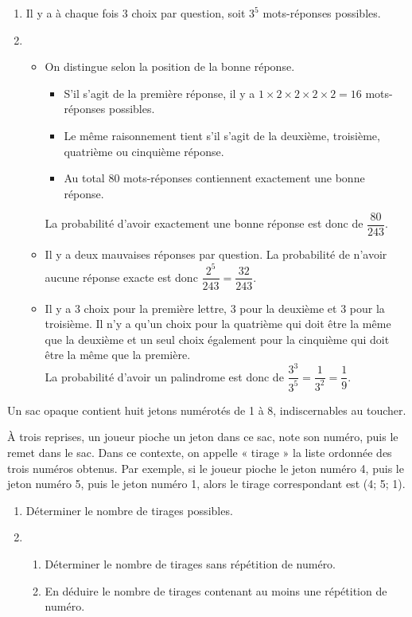 \documentclass[11pt,fleqn, openany]{book} %
\begin{document}
\begin{solution}\hspace{0pt}
\vspace{-0.5cm}
\begin{enumerate}
\item Il y a à chaque fois 3 choix par question, soit $3^5$ mots-réponses possibles.
\item 
\begin{itemize}
\item  On distingue selon la position de la bonne réponse.
\begin{itemize}
\item S'il s'agit de la première réponse, il y a $1 \times 2 \times 2 \times 2 \times 2 = 16$ mots-réponses possibles.
\item Le même raisonnement tient s'il s'agit de la deuxième, troisième, quatrième ou cinquième réponse.
\item Au total 80 mots-réponses contiennent exactement une bonne réponse.
\end{itemize}
La probabilité d'avoir exactement une bonne réponse est donc de $\dfrac{80}{243}$.
\item Il y a deux mauvaises réponses par question. La probabilité de n'avoir aucune réponse exacte est donc $\dfrac{2^5}{243}=\dfrac{32}{243}$.
\item Il y a 3 choix pour la première lettre, 3 pour la deuxième et 3 pour la troisième. Il n'y a qu'un choix pour la quatrième qui doit être la même que la deuxième et un seul choix également pour la cinquième qui doit être la même que la première. \\La probabilité d'avoir un palindrome est donc de $\dfrac{3^3}{3^5}=\dfrac{1}{3^2}=\dfrac{1}{9}$.\end{itemize}
\end{enumerate}\end{solution}

\begin{exercise}[topic=comb02, subtitle={(Centres étrangers 2024)}]

Un sac opaque contient huit jetons numérotés de 1 à 8, indiscernables au toucher.

À trois reprises, un joueur pioche un jeton dans ce sac, note son numéro, puis le remet dans le sac. Dans ce contexte, on appelle « tirage » la liste ordonnée des trois numéros obtenus.
Par exemple, si le joueur pioche le jeton numéro 4, puis le jeton numéro 5, puis le jeton numéro 1, alors le tirage correspondant est (4; 5; 1).
\begin{enumerate}
\item Déterminer le nombre de tirages possibles.
\item\begin{enumerate}
\item Déterminer le nombre de tirages sans répétition de numéro.
\item En déduire le nombre de tirages contenant au moins une répétition de numéro.\end{enumerate}\end{enumerate}

\end{exercise}
\end{document}
